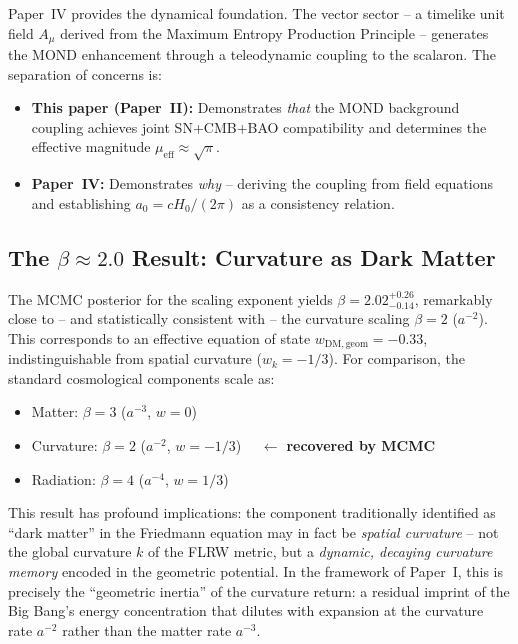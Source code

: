 \documentclass[aps,prd,twocolumn,superscriptaddress,nofootinbib,floatfix]{revtex4-2}
\begin{document}
Paper~IV \cite{Geiger2026d} provides the dynamical foundation. The vector sector -- a timelike unit field $A_\mu$ derived from the Maximum Entropy Production Principle -- generates the MOND enhancement through a teleodynamic coupling to the scalaron. The separation of concerns is:
\begin{itemize}
\item \textbf{This paper (Paper~II):} Demonstrates \emph{that} the MOND background coupling achieves joint SN+CMB+BAO compatibility and determines the effective magnitude $\mu_{\mathrm{eff}} \approx \sqrt{\pi}$.
\item \textbf{Paper~IV:} Demonstrates \emph{why} -- deriving the coupling from field equations and establishing $a_0 = cH_0/(2\pi)$ as a consistency relation.
\end{itemize}

\subsection{The \texorpdfstring{$\beta \approx 2.0$}{beta approx 2.0} Result: Curvature as Dark Matter}

The MCMC posterior for the scaling exponent yields $\beta = 2.02^{+0.26}_{-0.14}$, remarkably close to -- and statistically consistent with -- the curvature scaling $\beta = 2$ ($a^{-2}$). This corresponds to an effective equation of state $w_{\mathrm{DM,geom}} = -0.33$, indistinguishable from spatial curvature ($w_k = -1/3$). For comparison, the standard cosmological components scale as:
\begin{itemize}
\item Matter: $\beta = 3$ ($a^{-3}$, $w = 0$)
\item Curvature: $\beta = 2$ ($a^{-2}$, $w = -1/3$) $\quad\leftarrow$ \textbf{recovered by MCMC}
\item Radiation: $\beta = 4$ ($a^{-4}$, $w = 1/3$)
\end{itemize}

This result has profound implications: the component traditionally identified as ``dark matter'' in the Friedmann equation may in fact be \textit{spatial curvature} -- not the global curvature $k$ of the FLRW metric, but a \textit{dynamic, decaying curvature memory} encoded in the geometric potential. In the framework of Paper~I, this is precisely the ``geometric inertia'' of the curvature return: a residual imprint of the Big Bang's energy concentration that dilutes with expansion at the curvature rate $a^{-2}$ rather than the matter rate $a^{-3}$.
\end{document}
